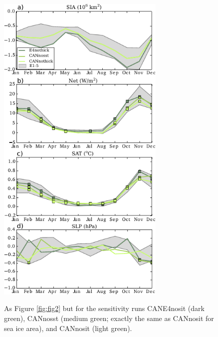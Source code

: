 \documentclass[twocol]{ametsoc}
\begin{document}
\begin{figure}[t]
  \noindent\includegraphics[width=19pc,angle=0]{seacyclessens.pdf}\\
  \caption{As Figure \ref{fig:fig2} but for the sensitivity runs CANE4nosit (dark green), CANnosst (medium green; exactly the same as CANnosit for sea ice area), and CANnosit (light green). 
}\label{fig:fig2b}
\end{figure} %
\end{document}
